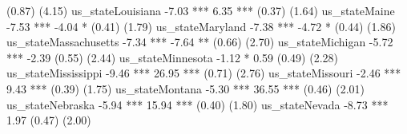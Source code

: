                                                                (0.87)        (4.15)                                 
us_stateLouisiana                                              -7.03 ***      6.35 ***                              
                                                               (0.37)        (1.64)                                 
us_stateMaine                                                  -7.53 ***     -4.04 *                                
                                                               (0.41)        (1.79)                                 
us_stateMaryland                                               -7.38 ***     -4.72 *                                
                                                               (0.44)        (1.86)                                 
us_stateMassachusetts                                          -7.34 ***     -7.64 **                               
                                                               (0.66)        (2.70)                                 
us_stateMichigan                                               -5.72 ***     -2.39                                  
                                                               (0.55)        (2.44)                                 
us_stateMinnesota                                              -1.12 *        0.59                                  
                                                               (0.49)        (2.28)                                 
us_stateMississippi                                            -9.46 ***     26.95 ***                              
                                                               (0.71)        (2.76)                                 
us_stateMissouri                                               -2.46 ***      9.43 ***                              
                                                               (0.39)        (1.75)                                 
us_stateMontana                                                -5.30 ***     36.55 ***                              
                                                               (0.46)        (2.01)                                 
us_stateNebraska                                               -5.94 ***     15.94 ***                              
                                                               (0.40)        (1.80)                                 
us_stateNevada                                                 -8.73 ***      1.97                                  
                                                               (0.47)        (2.00)                                 
